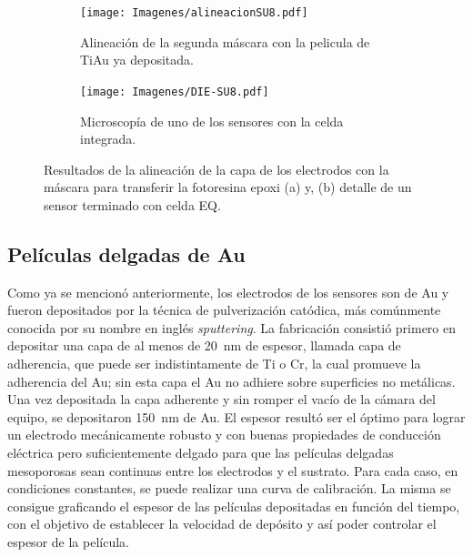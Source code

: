 { 				%
 				\begin{figure}[bh!]
			 	   	    \centering
			 	   	    \begin{subfigure}[t]{0.495\textwidth}
			        	\texttt{[image: Imagenes/alineacionSU8.pdf]}
			       		\caption{Alineación de la segunda máscara con la pelicula de Ti\textbar Au ya depositada.}
			         	\label{fig:alineacion}
			     		\end{subfigure}
			     		\begin{subfigure}[t]{0.495\textwidth}
			     		\texttt{[image: Imagenes/DIE-SU8.pdf]}
			    		\caption{Microscopía de uno de los sensores con la celda integrada.}
			     		\label{fig:die-su8}	
						\end{subfigure}
						\caption[Alineación y celda integrada en SU8]{Resultados de la alineación de la capa de los electrodos con la máscara para transferir la fotoresina epoxi (a) y, (b) detalle de un sensor terminado con celda EQ.}
			     		\label{fig:resultados-su8}
			     	   	\end{figure}

 		\subsection{Películas delgadas de Au}

		 Como ya se mencionó anteriormente, los electrodos de los sensores son de Au y fueron depositados por la técnica de pulverización catódica, más comúnmente conocida por su nombre en inglés \textit{sputtering}. La fabricación consistió primero en depositar una capa de al menos de \SI{20}{\nm} de espesor, llamada capa de  adherencia, que puede ser indistintamente de Ti o Cr, la cual promueve la adherencia del Au; sin esta capa el Au no adhiere sobre superficies no metálicas.\cite{Hieber1976} Una vez depositada la capa adherente y sin romper el vacío de la cámara del equipo, se depositaron \SI{150}{nm} de Au. El espesor resultó ser el óptimo para lograr un electrodo mecánicamente robusto y con buenas propiedades de conducción eléctrica pero suficientemente delgado para que las películas delgadas mesoporosas sean continuas entre los electrodos y el sustrato. Para cada caso, en condiciones constantes, se puede realizar una curva de calibración. La misma se consigue graficando el espesor de las películas depositadas en función del tiempo, con el objetivo de establecer la velocidad de depósito y así poder controlar el espesor de la película. 

}
